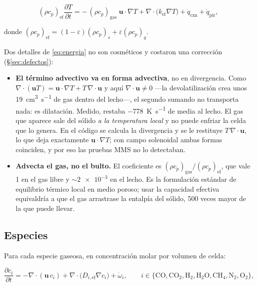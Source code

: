 \begin{equation}
(\rho c_p)_{\mathrm{ef}}\frac{\partial T}{\partial t}
= -\,(\rho c_p)_{\mathrm{gas}}\;\mathbf{u}\cdot\nabla T
+ \nabla\!\cdot\!\big(k_{\mathrm{ef}}\nabla T\big)
+ \dot{q}_{\mathrm{rxn}} + \dot{q}_{\mathrm{pir}},
\label{eq:energia}
\end{equation}

donde $(\rho c_p)_{\mathrm{ef}} = (1-\varepsilon)(\rho c_p)_{s} + \varepsilon(\rho c_p)_{g}$.

Dos detalles de \eqref{eq:energia} no son cosméticos y costaron una corrección
(\S\ref{sec:defectos}):

\begin{itemize}[leftmargin=*,itemsep=2pt]
\item \textbf{El término advectivo va en forma advectiva}, no en divergencia.
Como
$\nabla\!\cdot\!(\mathbf{u}T) = \mathbf{u}\cdot\nabla T + T\,\nabla\!\cdot\!\mathbf{u}$
y aquí $\nabla\!\cdot\!\mathbf{u}\neq 0$ ---la devolatilización crea unos
\qty{19}{\centi\meter\cubed\per\second} de gas dentro del lecho---, el segundo
sumando no transporta nada: es dilatación. Medido, restaba \SI{-778}{\kelvin\per\second}
de media al lecho. El gas que aparece sale del sólido \emph{a la temperatura
local} y no puede enfriar la celda que lo genera. En el código se calcula la
divergencia y se le restituye $T\,\nabla\!\cdot\!\mathbf{u}$, lo que deja
exactamente $\mathbf{u}\cdot\nabla T$; con campo solenoidal ambas formas
coinciden, y por eso las pruebas MMS no lo detectaban.
\item \textbf{Advecta el gas, no el bulto.} El coeficiente es
$(\rho c_p)_{\mathrm{gas}}/(\rho c_p)_{\mathrm{ef}}$, que vale 1 en el gas libre
y $\sim\!\num{2e-3}$ en el lecho. Es la formulación estándar de equilibrio
térmico local en medio poroso; usar la capacidad efectiva equivaldría a que el
gas arrastrase la entalpía del sólido, 500 veces mayor de la que puede llevar.
\end{itemize}

\subsection{Especies}

Para cada especie gaseosa, en concentración molar por volumen de celda:

\begin{equation}
\frac{\partial c_i}{\partial t}
= -\nabla\!\cdot\!(\mathbf{u}\,c_i)
+ \nabla\!\cdot\!\big(D_{i,\mathrm{ef}}\nabla c_i\big)
+ \dot{\omega}_i ,
\qquad i \in \{\mathrm{CO},\mathrm{CO_2},\mathrm{H_2},\mathrm{H_2O},\mathrm{CH_4},\mathrm{N_2},\mathrm{O_2}\},
\end{equation}


